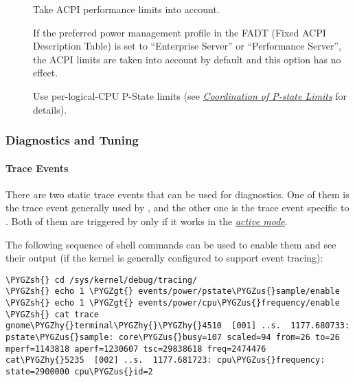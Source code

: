 \documentclass[a4paper,8pt,english]{sphinxmanual}
\def\PYGZus{\char`\_}
\def\PYGZgt{\char`\>}
\def\PYGZsh{\char`\#}
\def\PYGZhy{\char`\-}
\begin{document}
\begin{description}
\item[{}] \leavevmode
Take ACPI  performance limits into account.

If the preferred power management profile in the FADT (Fixed ACPI
Description Table) is set to ``Enterprise Server'' or ``Performance
Server'', the ACPI  limits are taken into account by default
and this option has no effect.

\item[{}] \leavevmode
Use per-logical-CPU P-State limits (see {\hyperref[admin\string-guide/pm/intel_pstate:coordination\string-of\string-p\string-state\string-limits]{\emph{Coordination of P-state
Limits}}} for details).

\end{description}


\subsubsection{Diagnostics and Tuning}
\label{admin-guide/pm/intel_pstate:diagnostics-and-tuning}

\paragraph{Trace Events}
\label{admin-guide/pm/intel_pstate:trace-events}
There are two static trace events that can be used for 
diagnostics.  One of them is the  trace event generally used
by , and the other one is the  trace event specific
to .  Both of them are triggered by  only if
it works in the {\hyperref[admin\string-guide/pm/intel_pstate:active\string-mode]{\emph{active mode}}}\label{admin-guide/pm/intel_pstate:active-mode}.

The following sequence of shell commands can be used to enable them and see
their output (if the kernel is generally configured to support event tracing):

\begin{Verbatim}[commandchars=\\\{\}]
\PYGZsh{} cd /sys/kernel/debug/tracing/
\PYGZsh{} echo 1 \PYGZgt{} events/power/pstate\PYGZus{}sample/enable
\PYGZsh{} echo 1 \PYGZgt{} events/power/cpu\PYGZus{}frequency/enable
\PYGZsh{} cat trace
gnome\PYGZhy{}terminal\PYGZhy{}\PYGZhy{}4510  [001] ..s.  1177.680733: pstate\PYGZus{}sample: core\PYGZus{}busy=107 scaled=94 from=26 to=26 mperf=1143818 aperf=1230607 tsc=29838618 freq=2474476
cat\PYGZhy{}5235  [002] ..s.  1177.681723: cpu\PYGZus{}frequency: state=2900000 cpu\PYGZus{}id=2
\end{Verbatim}
\end{document}

